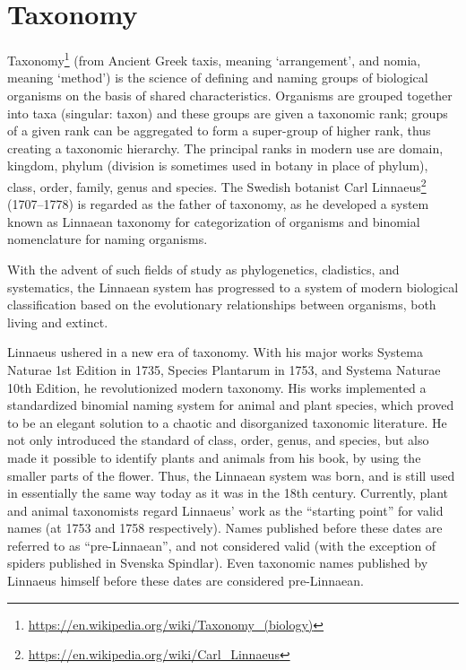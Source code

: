 \documentclass[]{book}
\let\rmarkdownfootnote\footnote%
\def\footnote{\protect\rmarkdownfootnote}
\renewcommand{\href}[2]{#2\footnote{\url{#1}}}
\begin{document}
\hypertarget{taxonomy}{%
\section{Taxonomy}\label{taxonomy}}

\href{https://en.wikipedia.org/wiki/Taxonomy_(biology)}{Taxonomy} (from Ancient Greek taxis, meaning `arrangement', and nomia, meaning `method') is the science of defining and naming groups of biological organisms on the basis of shared characteristics. Organisms are grouped together into taxa (singular: taxon) and these groups are given a taxonomic rank; groups of a given rank can be aggregated to form a super-group of higher rank, thus creating a taxonomic hierarchy. The principal ranks in modern use are domain, kingdom, phylum (division is sometimes used in botany in place of phylum), class, order, family, genus and species. The Swedish botanist \href{https://en.wikipedia.org/wiki/Carl_Linnaeus}{Carl Linnaeus} (1707--1778) is regarded as the father of taxonomy, as he developed a system known as Linnaean taxonomy for categorization of organisms and binomial nomenclature for naming organisms.

With the advent of such fields of study as phylogenetics, cladistics, and systematics, the Linnaean system has progressed to a system of modern biological classification based on the evolutionary relationships between organisms, both living and extinct.

Linnaeus ushered in a new era of taxonomy. With his major works Systema Naturae 1st Edition in 1735, Species Plantarum in 1753, and Systema Naturae 10th Edition, he revolutionized modern taxonomy. His works implemented a standardized binomial naming system for animal and plant species, which proved to be an elegant solution to a chaotic and disorganized taxonomic literature. He not only introduced the standard of class, order, genus, and species, but also made it possible to identify plants and animals from his book, by using the smaller parts of the flower. Thus, the Linnaean system was born, and is still used in essentially the same way today as it was in the 18th century. Currently, plant and animal taxonomists regard Linnaeus' work as the ``starting point'' for valid names (at 1753 and 1758 respectively). Names published before these dates are referred to as ``pre-Linnaean'', and not considered valid (with the exception of spiders published in Svenska Spindlar). Even taxonomic names published by Linnaeus himself before these dates are considered pre-Linnaean.
\end{document}
